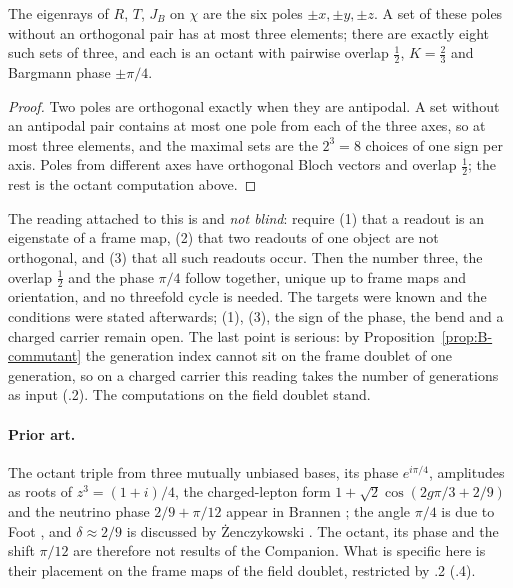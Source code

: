 \begin{proposition}\label{prop:B-readouts}
The eigenrays of $R$, $T$, $J_B$ on $\chi$ are the six poles $\pm x,\pm y,\pm z$. A set of these poles without an
orthogonal pair has at most three elements; there are exactly eight such sets of three, and each is an octant with pairwise
overlap $\tfrac12$, $K=\tfrac23$ and Bargmann phase $\pm\pi/4$.
\end{proposition}

\begin{proof}
Two poles are orthogonal exactly when they are antipodal. A set without an antipodal pair contains at most one pole from each
of the three axes, so at most three elements, and the maximal sets are the $2^3=8$ choices of one sign per axis. Poles from
different axes have orthogonal Bloch vectors and overlap $\tfrac12$; the rest is the octant computation above.
\end{proof}

The reading attached to this is \Reading{} and \emph{not blind}: require (1) that a readout is an eigenstate of a frame map,
(2) that two readouts of one object are not orthogonal, and (3) that all such readouts occur. Then the number three, the overlap
$\tfrac12$ and the phase $\pi/4$ follow together, unique up to frame maps and orientation, and no threefold cycle is needed.
The targets were known and the conditions were stated afterwards; (1), (3), the sign of the phase, the bend and a charged
carrier remain open. The last point is serious: by Proposition~\ref{prop:B-commutant} the generation index cannot sit on the
frame doublet of one generation, so on a charged carrier this reading takes the number of generations as input (.2).
The computations on the field doublet stand.

\paragraph{Prior art.}
The octant triple from three mutually unbiased bases, its phase $e^{i\pi/4}$, amplitudes as roots of $z^3=(1+i)/4$, the
charged-lepton form $1+\sqrt2\cos(2g\pi/3+2/9)$ and the neutrino phase $2/9+\pi/12$ appear in Brannen \cite{Brannen2010};
the angle $\pi/4$ is due to Foot \cite{Foot1994}, and $\delta\approx2/9$ is discussed by \.Zenczykowski \cite{Zenczykowski2012}.
The octant, its phase and the shift $\pi/12$ are therefore not results of the Companion. What is specific here is their
placement on the frame maps of the field doublet, restricted by .2 (.4).

